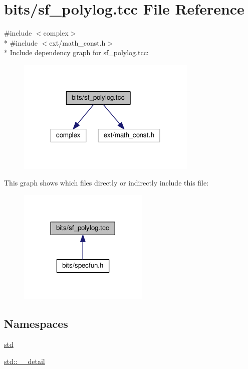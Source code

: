 \hypertarget{sf__polylog_8tcc}{}\section{bits/sf\+\_\+polylog.tcc File Reference}
\label{sf__polylog_8tcc}
{\ttfamily \#include $<$complex$>$}\\*
{\ttfamily \#include $<$ext/math\+\_\+const.\+h$>$}\\*
Include dependency graph for sf\+\_\+polylog.\+tcc\+:
\nopagebreak
\begin{figure}[H]
\begin{center}
\leavevmode
\includegraphics[width=244pt]{sf__polylog_8tcc__incl}
\end{center}
\end{figure}
This graph shows which files directly or indirectly include this file\+:
\nopagebreak
\begin{figure}[H]
\begin{center}
\leavevmode
\includegraphics[width=176pt]{sf__polylog_8tcc__dep__incl}
\end{center}
\end{figure}
\subsection*{Namespaces}
\begin{DoxyCompactItemize}
\item 
 \hyperlink{namespacestd}{std}
\item 
 \hyperlink{namespacestd_1_1____detail}{std\+::\+\_\+\+\_\+detail}
\end{DoxyCompactItemize}
